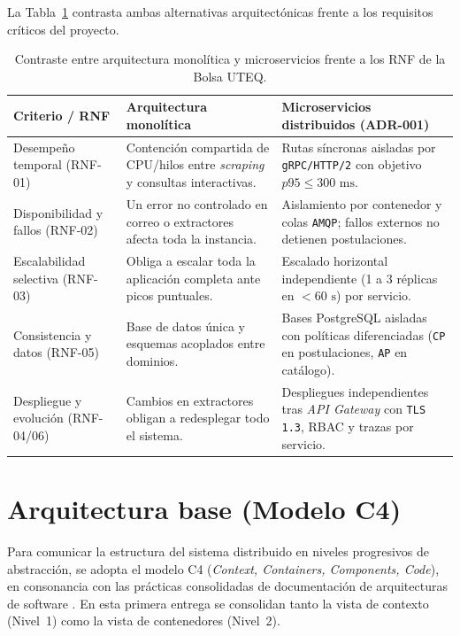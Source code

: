 \documentclass[11pt,a4paper]{article}
\begin{document}
La Tabla~\ref{tab:monolito-vs-microservicios} contrasta ambas alternativas arquitectónicas frente a los requisitos críticos del proyecto.

\begin{table}[htbp]
\centering
\caption{Contraste entre arquitectura monolítica y microservicios frente a los RNF de la Bolsa UTEQ.}
\label{tab:monolito-vs-microservicios}
\small
\begin{tabularx}{\textwidth}{>{\raggedright\arraybackslash}p{2.9cm} >{\raggedright\arraybackslash}p{5.0cm} X}
\toprule
\textbf{Criterio / RNF} & \textbf{Arquitectura monolítica} & \textbf{Microservicios distribuidos (ADR-001)} \\
\midrule
Desempeño temporal (RNF-01) & Contención compartida de CPU/hilos entre \textit{scraping} y consultas interactivas. & Rutas síncronas aisladas por \texttt{gRPC/HTTP/2} con objetivo $p95 \le 300\text{ ms}$. \\
Disponibilidad y fallos (RNF-02) & Un error no controlado en correo o extractores afecta toda la instancia. & Aislamiento por contenedor y colas \texttt{AMQP}; fallos externos no detienen postulaciones. \\
Escalabilidad selectiva (RNF-03) & Obliga a escalar toda la aplicación completa ante picos puntuales. & Escalado horizontal independiente (1 a 3 réplicas en $< 60\text{ s}$) por servicio. \\
Consistencia y datos (RNF-05) & Base de datos única y esquemas acoplados entre dominios. & Bases PostgreSQL aisladas con políticas diferenciadas (\texttt{CP} en postulaciones, \texttt{AP} en catálogo). \\
Despliegue y evolución (RNF-04/06) & Cambios en extractores obligan a redesplegar todo el sistema. & Despliegues independientes tras \textit{API Gateway} con \texttt{TLS 1.3}, RBAC y trazas por servicio. \\
\bottomrule
\end{tabularx}
\end{table}

\section{Arquitectura base (Modelo C4)}

Para comunicar la estructura del sistema distribuido en niveles progresivos de abstracción, se adopta el modelo C4 (\textit{Context, Containers, Components, Code}), en consonancia con las prácticas consolidadas de documentación de arquitecturas de software \cite{garces2021}. En esta primera entrega se consolidan tanto la vista de contexto (Nivel~1) como la vista de contenedores (Nivel~2).
\end{document}
